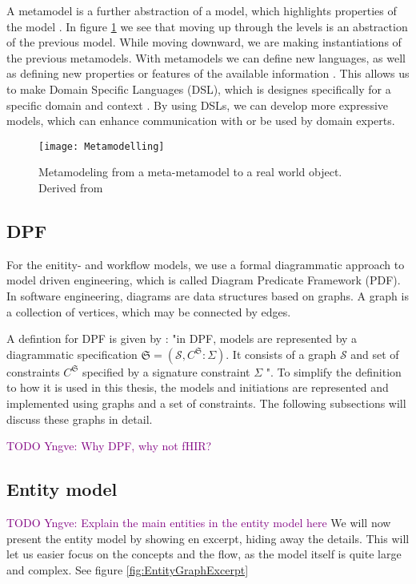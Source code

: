 A metamodel is a further abstraction of a model, which highlights properties of the model \parencite{Brambilla2017}. In figure \ref{fig:Metamodelling} we see that moving up through the levels is an abstraction of the previous model. While moving downward, we are making instantiations of the previous metamodels. With metamodels we can define new languages, as well as defining new properties or features of the available information \parencite{Brambilla2017}. This allows us to make Domain Specific Languages (DSL), which is designes specifically for a specific domain and context \parencite{Brambilla2017}\parencite{RodriguesdaSilva2015}. By using DSLs, we can develop more expressive models, which can enhance communication with or be used by domain experts. 

\begin{figure}[h!]
	\texttt{[image: Metamodelling]}
	\caption{Metamodeling from a meta-metamodel to a real world object. Derived from \parencite{Brambilla2017}}
	\label{fig:Metamodelling}
\end{figure}

\subsection{DPF}
For the enitity- and workflow models, we use a formal diagrammatic approach to model driven engineering, which is called Diagram Predicate Framework (PDF). In software engineering, diagrams are data structures based on graphs. A graph is a collection of vertices, which may be connected by edges.

A defintion for DPF is given by \textcite{Rutle2010}: "in DPF, models are represented by a diagrammatic specification \(\mathfrak{S} = ({\mathcal{S}}, C^{\mathfrak{S}} : \Sigma)\). It consists of a graph \(\mathcal{S}\) and set of constraints \(C^{\mathfrak{S}}\) specified by a signature constraint $\Sigma$ ". To simplify the definition to how it is used in this thesis, the models and initiations are represented and implemented using graphs and a set of constraints. The following subsections will discuss these graphs in detail.


\textcolor{purple}{TODO Yngve: Why DPF, why not fHIR?}
\subsection{Entity model}
\textcolor{purple}{TODO Yngve: Explain the main entities in the entity model here}
We will now present the entity model by showing en excerpt, hiding away the details. This will let us easier focus on the concepts and the flow, as the model itself is quite large and complex. See figure \ref{fig:EntityGraphExcerpt}

